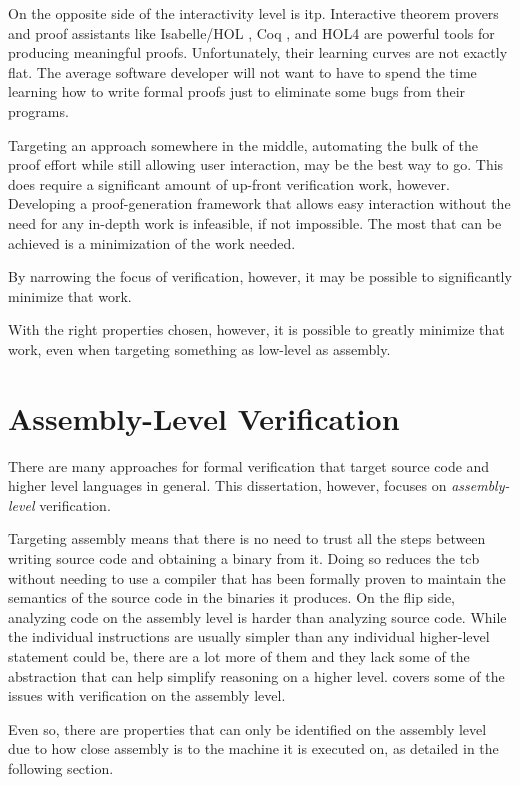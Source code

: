On the opposite side of the interactivity level is \ac{itp}.
Interactive theorem provers and proof assistants
like Isabelle/HOL \autocite{nipkow2002isabelle}, Coq \autocite{chlipala2013certified},
and HOL4 \autocite{slind2008brief} are powerful tools for producing meaningful proofs.
Unfortunately, their learning curves are not exactly flat.
The average software developer will not want to have to spend the time
learning how to write formal proofs just to eliminate some bugs from their programs.

Targeting an approach somewhere in the middle,
automating the bulk of the proof effort while still allowing user interaction,
may be the best way to go.
This does require a significant amount of up-front verification work, however.
Developing a proof-generation framework that allows easy interaction
without the need for any in-depth work is infeasible, if not impossible.
The most that can be achieved is a minimization of the work needed.

By narrowing the focus of verification, however, it may be possible to significantly
minimize that work.

With the right properties chosen, however, it is possible to greatly minimize that work, even when targeting something as low-level as assembly.

\section{Assembly-Level Verification}
There are many approaches for formal verification that target source code
and higher level languages in general.
This dissertation, however, focuses on \emph{assembly-level} verification.

Targeting assembly means that there is no need to trust all the steps between
writing source code and obtaining a binary from it.
Doing so reduces the \ac{tcb} without needing to use a compiler
that has been formally proven to maintain the semantics of the source code
in the binaries it produces. On the flip side, analyzing code on the assembly level
is harder than analyzing source code.
While the individual instructions are usually simpler
than any individual higher-level statement could be,
there are a lot more of them and they lack some of the abstraction
that can help simplify reasoning on a higher level. 
covers some of the issues with verification on the assembly level.

Even so, there are properties that can only be identified on the assembly level
due to how close assembly is to the machine it is executed on,
as detailed in the following section.

